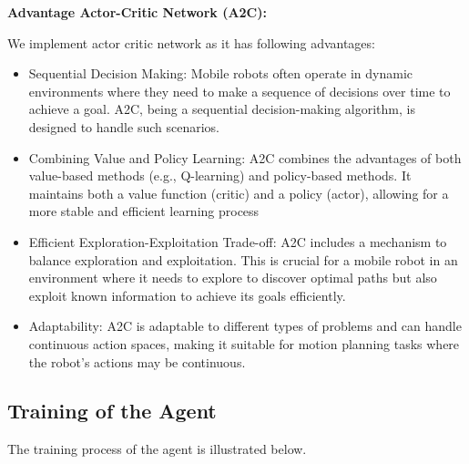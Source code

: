 \documentclass[conference]{IEEEtran}
\begin{document}
\textbf{Advantage Actor-Critic Network (A2C):}
\smallskip

We implement actor critic network as it has following advantages:

\begin{itemize}
    \item Sequential Decision Making: Mobile robots often operate in dynamic environments where they need to make a sequence of decisions over time to achieve a goal. A2C, being a sequential decision-making algorithm, is designed to handle such scenarios.

    \item Combining Value and Policy Learning: A2C combines the advantages of both value-based methods (e.g., Q-learning) and policy-based methods. It maintains both a value function (critic) and a policy (actor), allowing for a more stable and efficient learning process

    \item Efficient Exploration-Exploitation Trade-off: A2C includes a mechanism to balance exploration and exploitation. This is crucial for a mobile robot in an environment where it needs to explore to discover optimal paths but also exploit known information to achieve its goals efficiently.

    \item Adaptability: A2C is adaptable to different types of problems and can handle continuous action spaces, making it suitable for motion planning tasks where the robot's actions may be continuous.
\end{itemize}


\subsection{Training of the Agent}
The training process of the agent is illustrated below.
\end{document}

